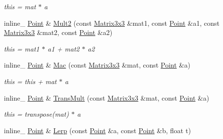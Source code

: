 \begin{DoxyCompactItemize}
\begin{DoxyCompactList}\small\item\em this = mat $\ast$ a \end{DoxyCompactList}\item 
inline\+\_\+ \hyperlink{classOpcode_1_1Point}{Point} \& \hyperlink{classOpcode_1_1Point_af01e8da4c2b949ca9729cab295c8a67b}{Mult2} (const \hyperlink{classOpcode_1_1Matrix3x3}{Matrix3x3} \&mat1, const \hyperlink{classOpcode_1_1Point}{Point} \&a1, const \hyperlink{classOpcode_1_1Matrix3x3}{Matrix3x3} \&mat2, const \hyperlink{classOpcode_1_1Point}{Point} \&a2)\hypertarget{classOpcode_1_1Point_af01e8da4c2b949ca9729cab295c8a67b}{}\label{classOpcode_1_1Point_af01e8da4c2b949ca9729cab295c8a67b}

\begin{DoxyCompactList}\small\item\em this = mat1 $\ast$ a1 + mat2 $\ast$ a2 \end{DoxyCompactList}\item 
inline\+\_\+ \hyperlink{classOpcode_1_1Point}{Point} \& \hyperlink{classOpcode_1_1Point_a9869c21470aa62c9041eeea1e451cef0}{Mac} (const \hyperlink{classOpcode_1_1Matrix3x3}{Matrix3x3} \&mat, const \hyperlink{classOpcode_1_1Point}{Point} \&a)\hypertarget{classOpcode_1_1Point_a9869c21470aa62c9041eeea1e451cef0}{}\label{classOpcode_1_1Point_a9869c21470aa62c9041eeea1e451cef0}

\begin{DoxyCompactList}\small\item\em this = this + mat $\ast$ a \end{DoxyCompactList}\item 
inline\+\_\+ \hyperlink{classOpcode_1_1Point}{Point} \& \hyperlink{classOpcode_1_1Point_ac33e525bd7c94a51defb1975915f63c9}{Trans\+Mult} (const \hyperlink{classOpcode_1_1Matrix3x3}{Matrix3x3} \&mat, const \hyperlink{classOpcode_1_1Point}{Point} \&a)\hypertarget{classOpcode_1_1Point_ac33e525bd7c94a51defb1975915f63c9}{}\label{classOpcode_1_1Point_ac33e525bd7c94a51defb1975915f63c9}

\begin{DoxyCompactList}\small\item\em this = transpose(mat) $\ast$ a \end{DoxyCompactList}\item 
inline\+\_\+ \hyperlink{classOpcode_1_1Point}{Point} \& \hyperlink{classOpcode_1_1Point_a74153f388e884f1760cf3ed6a43b060a}{Lerp} (const \hyperlink{classOpcode_1_1Point}{Point} \&a, const \hyperlink{classOpcode_1_1Point}{Point} \&b, float t)\hypertarget{classOpcode_1_1Point_a74153f388e884f1760cf3ed6a43b060a}{}\label{classOpcode_1_1Point_a74153f388e884f1760cf3ed6a43b060a}


\end{DoxyCompactItemize}
